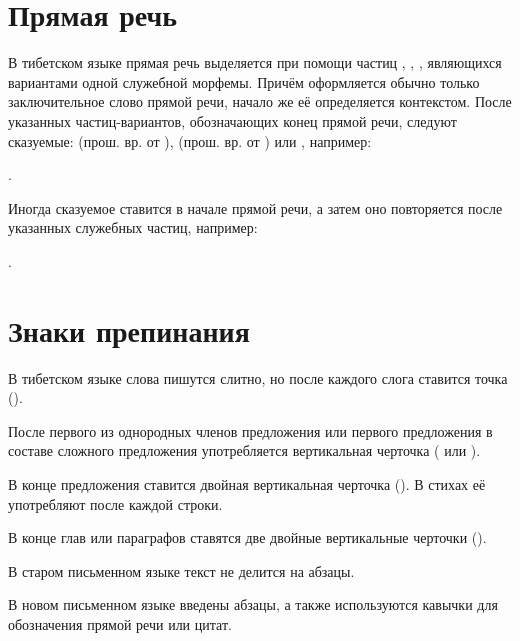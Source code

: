 \section{Прямая речь}

В тибетском языке прямая речь выделяется при помощи частиц , , , являющихся вариантами одной служебной морфемы. Причём оформляется обычно только заключительное слово прямой речи, начало же её определяется контекстом. После указанных частиц-вариантов, обозначающих конец прямой речи, следуют сказуемые:
 (прош. вр. от ),
 (прош. вр. от ) или
, например:
\begin{prfsample}
	\item {}.
\end{prfsample}

Иногда сказуемое  ставится в начале прямой речи, а затем оно повторяется после указанных служебных частиц, например:
\begin{prfsample}
	\item {}.
\end{prfsample}

\section{Знаки препинания}

В тибетском языке слова пишутся слитно, но после каждого слога ставится точка ().

После первого из однородных членов предложения или первого предложения в составе сложного предложения употребляется вертикальная черточка ( или
).

В конце предложения ставится двойная вертикальная черточка (). В стихах её употребляют после каждой строки.

В конце глав или параграфов ставятся две двойные вертикальные черточки ().

В старом письменном языке текст не делится на абзацы.

В новом письменном языке введены абзацы, а также используются кавычки для обозначения прямой речи или цитат.